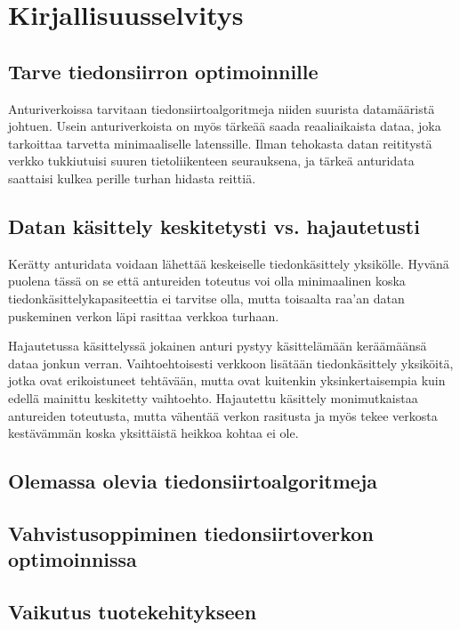 \section{Kirjallisuusselvitys}

\subsection{Tarve tiedonsiirron optimoinnille}
Anturiverkoissa tarvitaan tiedonsiirtoalgoritmeja niiden suurista datamääristä
johtuen. Usein anturiverkoista on myös tärkeää saada reaaliaikaista dataa, joka
tarkoittaa tarvetta minimaaliselle latenssille. Ilman tehokasta datan
reititystä verkko tukkiutuisi suuren tietoliikenteen seurauksena, ja tärkeä
anturidata saattaisi kulkea perille turhan hidasta reittiä. 

\subsection{Datan käsittely keskitetysti vs. hajautetusti}
Kerätty anturidata voidaan lähettää keskeiselle tiedonkäsittely yksikölle.
Hyvänä puolena tässä on se että antureiden toteutus voi olla minimaalinen koska
tiedonkäsittelykapasiteettia ei tarvitse olla, mutta toisaalta raa'an datan
puskeminen verkon läpi rasittaa verkkoa turhaan.

Hajautetussa käsittelyssä jokainen anturi pystyy käsittelämään keräämäänsä
dataa jonkun verran. Vaihtoehtoisesti verkkoon lisätään tiedonkäsittely
yksiköitä, jotka ovat erikoistuneet tehtävään, mutta ovat kuitenkin
yksinkertaisempia kuin edellä mainittu keskitetty vaihtoehto. Hajautettu
käsittely monimutkaistaa antureiden toteutusta, mutta vähentää verkon rasitusta
ja myös tekee verkosta kestävämmän koska yksittäistä heikkoa kohtaa ei ole.

\subsection{Olemassa olevia tiedonsiirtoalgoritmeja}

\subsection{Vahvistusoppiminen tiedonsiirtoverkon optimoinnissa}

\subsection{Vaikutus tuotekehitykseen}
